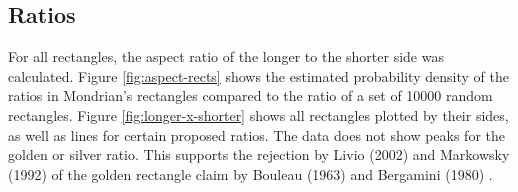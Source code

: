 \documentclass[serif,article,noparskip]{agse-thesis}
\begin{document}
\subsection{Ratios} \label{ratios}

For all rectangles, the aspect ratio of the longer to the shorter side was
calculated. Figure \ref{fig:aspect-rects} shows the estimated probability
density of the ratios in Mondrian's rectangles compared to the ratio of a set of
10000 random rectangles. Figure \ref{fig:longer-x-shorter} shows all rectangles
plotted by their sides, as well as lines for certain proposed ratios. The data
does not show peaks for the golden or silver ratio. This supports the rejection
by Livio (2002) \cite{Livio2002} and Markowsky (1992) \cite{Markowsky1992} of
the golden rectangle claim by Bouleau (1963) \cite{bouleau1963} and Bergamini
(1980) \cite{bergamini1980}.
\end{document}
